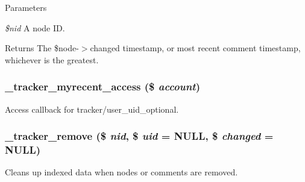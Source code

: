 \begin{DoxyParams}{Parameters}
\item[{\em \$nid}]A node ID.\end{DoxyParams}
\begin{DoxyReturn}{Returns}
The \$node-\/$>$changed timestamp, or most recent comment timestamp, whichever is the greatest. 
\end{DoxyReturn}
\hypertarget{tracker_8module_ac4856efc2417df78e8bf35c9703a057f}{
\subsubsection[{\_\-tracker\_\-myrecent\_\-access}]{\setlength{\rightskip}{0pt plus 5cm}\_\-tracker\_\-myrecent\_\-access (\$ {\em account})}}
\label{tracker_8module_ac4856efc2417df78e8bf35c9703a057f}
Access callback for tracker/user\_\-uid\_\-optional. \hypertarget{tracker_8module_a414225e6ad54c9fa8ca5578c83599a6f}{
\subsubsection[{\_\-tracker\_\-remove}]{\setlength{\rightskip}{0pt plus 5cm}\_\-tracker\_\-remove (\$ {\em nid}, \/  \$ {\em uid} = {\ttfamily NULL}, \/  \$ {\em changed} = {\ttfamily NULL})}}
\label{tracker_8module_a414225e6ad54c9fa8ca5578c83599a6f}
Cleans up indexed data when nodes or comments are removed.


